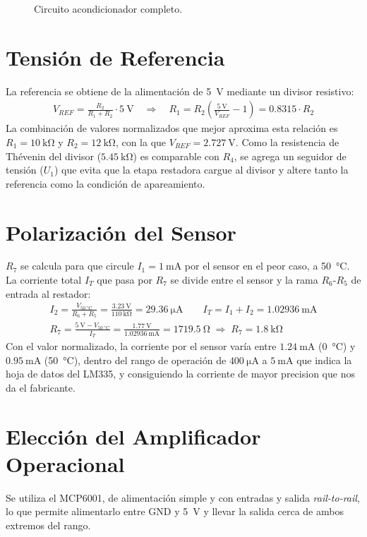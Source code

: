 \begin{figure}[!ht]
  \centering
  \resizebox{0.6\textwidth}{!}{}
  \caption{Circuito acondicionador completo.}
  \label{crkt:completo}
\end{figure}

\section{Tensión de Referencia}

La referencia se obtiene de la alimentación de \SI{5}{\volt} mediante un divisor resistivo:
\begin{gather*}
  V_{REF} = \frac{R_2}{R_1 + R_2} \cdot \SI{5}{\volt}
  \quad\Rightarrow\quad
  R_1 = R_2 \left( \frac{\SI{5}{\volt}}{V_{REF}} - 1 \right) = 0.8315 \cdot R_2
\end{gather*}
La combinación de valores normalizados que mejor aproxima esta relación es $R_1 = \SI{10}{\kilo\ohm}$ y
$R_2 = \SI{12}{\kilo\ohm}$, con la que $V_{REF} = \SI{2.727}{\volt}$. Como la resistencia de Thévenin del divisor
($\SI{5.45}{\kilo\ohm}$) es comparable con $R_4$, se agrega un seguidor de tensión ($U_1$) que evita que la
etapa restadora cargue al divisor y altere tanto la referencia como la condición de apareamiento.

\section{Polarización del Sensor}

$R_7$ se calcula para que circule $I_1 = \SI{1}{\milli\ampere}$ por el sensor en el peor caso, a \SI{50}{\celsius}.
La corriente total $I_T$ que pasa por $R_7$ se divide entre el sensor y la rama $R_6$-$R_5$ de entrada al restador:
\begin{gather*}
  I_2 = \frac{V_{\SI{50}{\celsius}}}{R_6 + R_5} = \frac{\SI{3.23}{\volt}}{\SI{110}{\kilo\ohm}}
    = \SI{29.36}{\micro\ampere}
  \qquad
  I_T = I_1 + I_2 = \SI{1.02936}{\milli\ampere}
  \\
  R_7 = \frac{\SI{5}{\volt} - V_{\SI{50}{\celsius}}}{I_T} = \frac{\SI{1.77}{\volt}}{\SI{1.02936}{\milli\ampere}}
    = \SI{1719.5}{\ohm} \;\Rightarrow\; R_7 = \SI{1.8}{\kilo\ohm}
\end{gather*}
Con el valor normalizado, la corriente por el sensor varía entre $\SI{1.24}{\milli\ampere}$ (\SI{0}{\celsius}) y
$\SI{0.95}{\milli\ampere}$ (\SI{50}{\celsius}), dentro del rango de operación de $\SI{400}{\micro\ampere}$ a
$\SI{5}{\milli\ampere}$ que indica la hoja de datos del LM335, y consiguiendo la corriente de mayor precision que nos
da el fabricante.

\section{Elección del Amplificador Operacional}

Se utiliza el MCP6001, de alimentación simple y con entradas y salida \textit{rail-to-rail}, lo que permite
alimentarlo entre GND y \SI{5}{\volt} y llevar la salida cerca de ambos extremos del rango.
